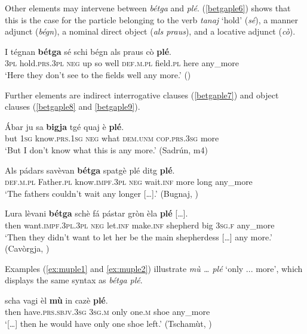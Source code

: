 Other elements may intervene between \textit{bétga} and \textit{plé}. (\ref{betgaple6}) shows that this is the case for the particle belonging to the verb \textit{tanaj} `hold' (\textit{sé}), a manner adjunct (\textit{bégn}), a nominal direct object (\textit{als praus}), and a locative adjunct (\textit{cò}).

\ea
\label{betgaple6}
\gll   I tégnan \textbf{bétga} sé schi bégn als praus cò \textbf{plé}. \\
\textsc{3pl} hold.\textsc{prs.3pl} \textsc{neg} up so well \textsc{def.m.pl} field.\textsc{pl} here any\_more \\
\glt `Here they don’t see to the fields well any more.' (\citealt[69]{Berther2007})
\z

Further elements are indirect interrogative clauses (\ref{betgaple7}) and object clauses (\ref{betgaple8} and \ref{betgaple9}).

\ea
\label{betgaple7}
\gll Ábar ju sa \textbf{bigja} tgé quaj è \textbf{plé}.\\
but \textsc{1sg} know.\textsc{prs.1sg} \textsc{neg} what \textsc{dem.unm} \textsc{cop.prs.3sg} more\\
\glt `But I don't know what this is any more.' (Sadrún, m4)
\z

\ea
\label{betgaple8}
\gll    Als pádars savèvan \textbf{bétga} spatgè plé ditg \textbf{plé}.\\
      \textsc{def.m.pl} Father.\textsc{pl} know.\textsc{impf.3pl} \textsc{neg} wait.\textsc{inf} more long any\_more\\
\glt `The fathers couldn’t wait any longer […].' (Bugnaj, \citealt[147]{Büchli1966})
\z

\ea
\label{betgaple9}
\gll    Lura lèvani \textbf{bétga} schè fá pástar gròn èla \textbf{plé} […].\\
     then want.\textsc{impf.3pl.3pl} \textsc{neg} let.\textsc{inf} make.\textsc{inf} shepherd big \textsc{3sg.f} any\_more\\
\glt `Then they didn’t want to let her be the main shepherdess […] any more.' (Cavòrgja, \citealt[119]{Büchli1966})
\z

Examples (\ref{ex:muple1} and \ref{ex:muple2}) illustrate \textit{mù … plé} `only ... more', which displays the same syntax as \textit{bétga plé}.

\ea
\label{ex:muple1}
\gll  [...] scha vagi èl \textbf{mù} in cazè \textbf{plé}.\\
{} then have.\textsc{prs.sbjv.3sg} \textsc{3sg.m} only one.\textsc{m} shoe any\_more \\
\glt `[…] then he would have only one shoe left.' (Tschamùt, \citealt[15]{Büchli1966})
\z

